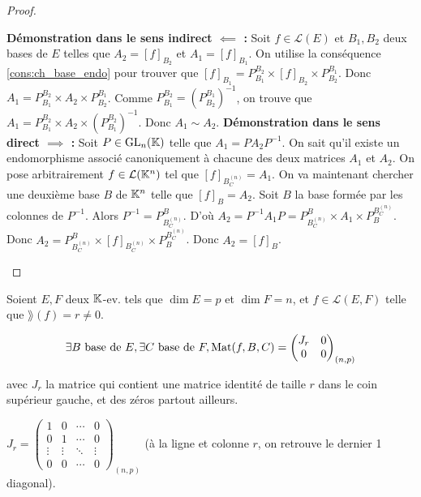 \documentclass[12pt,a4paper]{report}
\begin{document}
\begin{proof}
    \begin{outline}
        \1 \textbf{Démonstration dans le sens indirect $\impliedby$ :}
        \2 Soit $f \in \mathcal L(E)$ et $B_1,B_2$ deux bases de $E$ telles que $A_2 = [f]_{B_2}$ et $A_1 = [f]_{B_1}$.
        \2 On utilise la conséquence \ref{cons:ch_base_endo} pour trouver que $[f]_{B_1} = P_{B_1}^{B_2} \times [f]_{B_2} \times P_{B_2}^{B_1}$.
        \2 Donc $A_1 = P_{B_1}^{B_2} \times A_2 \times P_{B_2}^{B_1}$.
        \2 Comme $P_{B_1}^{B_2} = (P_{B_2}^{B_1})^{-1}$, on trouve que $A_1 = P_{B_1}^{B_2} \times A_2 \times (P_{B_1}^{B_2})^{-1}$.
        \2 Donc $A_1 \sim A_2$.
        \1 \textbf{Démonstration dans le sens direct $\implies$ :}
        \2 Soit $P \in \mathrm{GL}_n(\mathbb{K})$ telle que $A_1 = P A_2 P^{-1}$.
        \2 On sait qu'il existe un endomorphisme associé canoniquement à chacune des deux matrices $A_1$ et $A_2$.
        \2 On pose arbitrairement $f \in \mathcal L(\mathbb{K}^n)$ tel que $[f]_{B_C^{(n)}} = A_1$.
        \2 On va maintenant chercher une deuxième base $B$ de $\mathbb{K}^n$ telle que $[f]_B = A_2$.
        \2 Soit $B$ la base formée par les colonnes de $P^{-1}$.
        \2 Alors $P^{-1} = P_{B_C^{(n)}}^B$.
        \2 D'où $A_2 = P^{-1} A_1 P = P_{B_C^{(n)}}^B \times A_1 \times P_{B}^{B_C^{(n)}}$.
        \2 Donc $A_2 = P_{B_C^{(n)}}^B \times [f]_{B_C^{(n)}} \times P_{B}^{B_C^{(n)}}$.
        \2 Donc $A_2 = [f]_B$.
    \end{outline}
\end{proof}

\begin{property}
    Soient $E,F$ deux $\mathbb{K}$-ev. tels que $\dim E = p$ et $\dim F = n$, et $f \in \mathcal L(E,F)$ telle que $\rang(f) = r \ne 0$.

    $$\exists B \text{ base de } E, \exists C \text{ base de } F, \mathrm{Mat}(f,B,C) = \left(\begin{matrix} J_r & 0 \\ 0 & 0 \end{matrix}\right)_{(n,p)}$$

    avec $J_r$ la matrice qui contient une matrice identité de taille $r$ dans le coin supérieur gauche, et des zéros partout ailleurs.

    $J_r = \left(\begin{matrix} 1 & 0 & \cdots & 0 \\ 0 & 1 & \cdots & 0 \\ \vdots & \vdots & \ddots & \vdots \\ 0 & 0 & \cdots & 0 \end{matrix}\right)_{(n,p)}$ (à la ligne et colonne $r$, on retrouve le dernier 1 diagonal).
\end{property}
\end{document}
